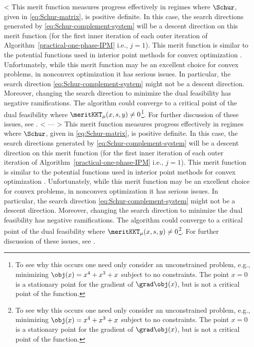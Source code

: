 < This merit function measures progress effectively in regimes where $\Schur$, given in \eqref{eq:Schur-matrix}, is positive definite. In this case, the search directions generated by \eqref{eq:Schur-complement-system} will be a descent direction on this merit function (for the first inner iteration of each outer iteration of Algorithm~\ref{practical-one-phase-IPM} i.e., $j = 1$). This merit function is similar to the potential functions used in interior point methods for convex optimization \cite{andersen1998computational,huang2016solution}. Unfortunately, while this merit function may be an excellent choice for convex problems, in nonconvex optimization it has serious issues. In particular, the search direction \eqref{eq:Schur-complement-system} might not be a descent direction. Moreover, changing the search direction to minimize the dual feasibility has negative ramifications. The algorithm could converge to a critical point of the dual feasibility where $\meritKKT_{\mu} ( x, s, y ) \neq 0$\footnote{To see why this occurs one need only consider an unconstrained problem, e.g., minimizing $\obj(x) = x^4 + x^3 + x$ subject to no constraints. The point $x = 0$ is a stationary point for the gradient of $\grad \obj(x)$, but is not a critical point of the function.}. For further discussion of these issues, see \cite{shanno2000interior}.
< %
---
> This merit function measures progress effectively in regimes where $\Schur$, given in \eqref{eq:Schur-matrix}, is positive definite. In this case, the search directions generated by \eqref{eq:Schur-complement-system} will be a descent direction on this merit function (for the first inner iteration of each outer iteration of Algorithm~\ref{practical-one-phase-IPM} i.e., $j = 1$). This merit function is similar to the potential functions used in interior point methods for convex optimization \cite{andersen1998computational,huang2016solution}. Unfortunately, while this merit function may be an excellent choice for convex problems, in nonconvex optimization it has serious issues. In particular, the search direction \eqref{eq:Schur-complement-system} might not be a descent direction. Moreover, changing the search direction to minimize the dual feasibility has negative ramifications. The algorithm could converge to a critical point of the dual feasibility where $\meritKKT_{\mu} ( x, s, y ) \neq 0$\footnote{To see why this occurs one need only consider an unconstrained problem, e.g., minimizing $\obj(x) = x^4 + x^3 + x$ subject to no constraints. The point $x = 0$ is a stationary point for the gradient of $\grad \obj(x)$, but is not a critical point of the function. }. For further discussion of these issues, see \cite{shanno2000interior}.
